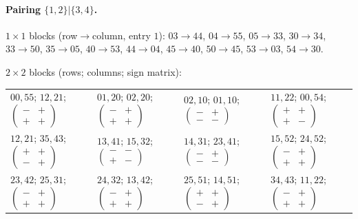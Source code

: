 \paragraph{Pairing $\{1,2\}|\{3,4\}$.}
$1\times1$ blocks (row$\to$column, entry $1$): $03\to44$, $04\to55$, $05\to33$, $30\to34$, $33\to50$, $35\to05$, $40\to53$, $44\to04$, $45\to40$, $50\to45$, $53\to03$, $54\to30$.

$2\times2$ blocks (rows; columns; sign matrix):
\begin{center}\small\begin{tabular}{llll}
$00,55$; $12,21$; $\left(\begin{smallmatrix}-&+\\+&+\end{smallmatrix}\right)$ & $01,20$; $02,20$; $\left(\begin{smallmatrix}-&+\\+&+\end{smallmatrix}\right)$ & $02,10$; $01,10$; $\left(\begin{smallmatrix}-&+\\-&-\end{smallmatrix}\right)$ & $11,22$; $00,54$; $\left(\begin{smallmatrix}+&+\\+&-\end{smallmatrix}\right)$ \\
$12,21$; $35,43$; $\left(\begin{smallmatrix}+&+\\-&+\end{smallmatrix}\right)$ & $13,41$; $15,32$; $\left(\begin{smallmatrix}-&-\\+&-\end{smallmatrix}\right)$ & $14,31$; $23,41$; $\left(\begin{smallmatrix}-&+\\-&-\end{smallmatrix}\right)$ & $15,52$; $24,52$; $\left(\begin{smallmatrix}-&+\\+&+\end{smallmatrix}\right)$ \\
$23,42$; $25,31$; $\left(\begin{smallmatrix}-&+\\+&+\end{smallmatrix}\right)$ & $24,32$; $13,42$; $\left(\begin{smallmatrix}-&+\\+&+\end{smallmatrix}\right)$ & $25,51$; $14,51$; $\left(\begin{smallmatrix}+&+\\-&+\end{smallmatrix}\right)$ & $34,43$; $11,22$; $\left(\begin{smallmatrix}-&+\\+&+\end{smallmatrix}\right)$ \\
\end{tabular}\end{center}

